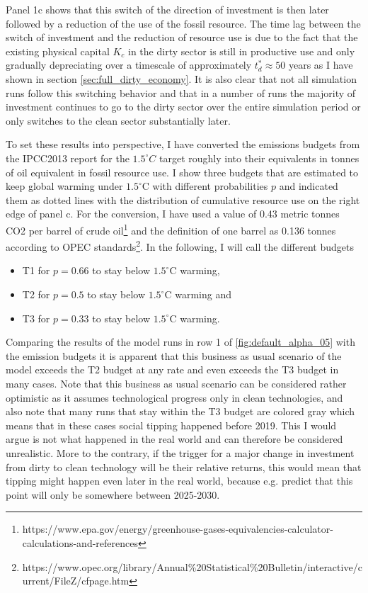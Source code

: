 Panel 1c shows that this switch of the direction of investment is then later followed by a reduction of the use of the fossil resource. The time lag between the switch of investment and the reduction of resource use is due to the fact that the existing physical capital $K_c$ in the dirty sector is still in productive use and only gradually depreciating over a timescale of approximately $t_{d}^{*}\approx 50$ years as I have shown in section \ref{sec:full_dirty_economy}. It is also clear that not all simulation runs follow this switching behavior and that in a number of runs the majority of investment continues to go to the dirty sector over the entire simulation period or only switches to the clean sector substantially later.

To set these results into perspective, I have converted the emissions budgets from the IPCC2013 report \citep{stocker2013climate} for the $1.5^{\circ}C$ target roughly into their equivalents in tonnes of oil equivalent in fossil resource use. I show three budgets that are estimated to keep global warming under $1.5^{\circ}$C with different probabilities $p$ and indicated them as dotted lines with the distribution of cumulative resource use on the right edge of panel c. For the conversion, I have used a value of 0.43 metric tonnes CO2 per barrel of crude oil\footnote{https://www.epa.gov/energy/greenhouse-gases-equivalencies-calculator-calculations-and-references} and the definition of one barrel as 0.136 tonnes according to OPEC standards\footnote{https://www.opec.org/library/Annual\%20Statistical\%20Bulletin/interactive/current/FileZ/cfpage.htm}.
In the following, I will call the different budgets
\begin{itemize}
  \item T1 for $p=0.66$ to stay below $1.5^{\circ}$C warming,
  \item T2 for $p=0.5$ to stay below $1.5^{\circ}$C warming and
  \item T3 for $p=0.33$ to stay below $1.5^{\circ}$C warming.
\end{itemize}


Comparing the results of the model runs in row 1 of \cref{fig:default_alpha_05} with the emission budgets it is apparent that this business as usual scenario of the model exceeds the T2 budget at any rate and even exceeds the T3 budget in many cases. Note that this business as usual scenario can be considered rather optimistic as it assumes technological progress only in clean technologies, and also note that many runs that stay within the T3 budget are colored gray which means that in these cases social tipping happened before 2019. This I would argue is not what happened in the real world and can therefore be considered unrealistic. More to the contrary, if the trigger for a major change in investment from dirty to clean technology will be their relative returns, this would mean that tipping might happen even later in the real world, because e.g. \cite{Farmer2016} predict that this point will only be somewhere between 2025-2030.

